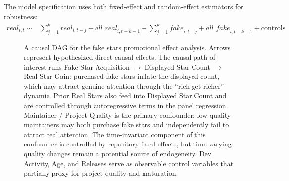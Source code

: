 The model specification uses both fixed-effect and random-effect estimators for robustness:
\begin{align*}
    \textit{real}_{i,t} \sim &\sum_{j=1}^k \textit{real}_{i, t-j} + \textit{all\_real}_{i, t - k - 1} + \sum_{j=1}^k \textit{fake}_{i, t-j} + \textit{all\_fake}_{i, t - k - 1} + \text{controls}
\end{align*}

\begin{figure}[t]
\centering
{}
\caption{A causal DAG for the fake stars promotional effect analysis.
Arrows represent hypothesized direct causal effects.
The causal path of interest runs Fake Star Acquisition $\to$ Displayed Star Count $\to$ Real Star Gain:
purchased fake stars inflate the displayed count, which may attract genuine attention through the ``rich get richer'' dynamic.
Prior Real Stars also feed into Displayed Star Count and are controlled through autoregressive terms in the panel regression.
Maintainer / Project Quality is the primary confounder: low-quality maintainers may both purchase fake stars and independently fail to attract real attention.
The time-invariant component of this confounder is controlled by repository-fixed effects, but time-varying quality changes remain a potential source of endogeneity.
Dev Activity, Age, and Releases serve as observable control variables that partially proxy for project quality and maturation.}
\label{fig:fake-stars-dag}
\end{figure}

